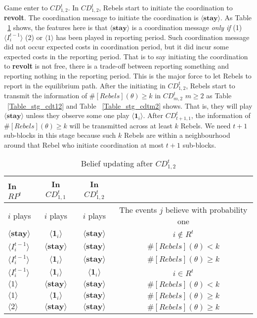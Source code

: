 \documentclass[12pt,letter]{article}
\theoremstyle{definition}
\theoremstyle{remark}
\theoremstyle{claim}
\begin{document}
Game enter to $CD^t_{1,2}$. In $CD^t_{1,2}$, Rebels start to initiate the coordination to \textbf{revolt}. The coordination message to initiate the coordination is $\langle \textbf{stay} \rangle$. As Table ~\ref{Table_blf_up_cdt12} shows, the features here is that $\langle \textbf{stay} \rangle$ is a coordination message \textit{only if} (1) $\langle  {I^{t-1}_i} \rangle$ (2) or $\langle 1 \rangle$ has been played in reporting period. Such coordination message did not occur expected costs in coordination period, but it did incur some expected costs in the reporting period. That is to say initiating the coordination to \textbf{revolt} is not free, there is a trade-off between reporting something and reporting nothing in the reporting period. This is the major force to let Rebels to report in the equilibrium path. After the initiating in $CD^t_{1,2}$, Rebels start to transmit the information of $\#[Rebels](\theta)\geq k$ in $CD^t_{m,2}$ $m\geq 2$ as Table ~\ref{Table_stg_cdt12} and Table ~\ref{Table_stg_cdtm2} shows. That is, they will play $\langle \textbf{stay} \rangle$ unless they observe some one play $\langle \mathbf{1}_i \rangle$. After $CD^t_{{t+1},1}$, the information of $\#[Rebels](\theta)\geq k$ will be transmitted across at least $k$ Rebels. We need $t+1$ sub-blocks in this stage because such $k$ Rebels are within a neighbourhood around that Rebel who initiate coordination at most $t+1$ sub-blocks.
\begin{table}[t]
\caption{Belief updating after $CD^t_{1,2}$}
\label{Table_blf_up_cdt12}
\begin{center}
\begin{tabular}{l c c c}
In $RP^t$ 	 	&  	In $CD^t_{1,1}$		&  In $CD^t_{1,2}$	  &\\
\hline
\hline
$i$ plays 		                             &  	$i$ plays		&				$i$ plays			& The events $j$ believe with probability one  \\
\hline
$\langle  \textbf{stay} \rangle$ 	& 	$\langle \mathbf{1}_i \rangle$	&  $\langle \textbf{stay} \rangle$ &  $i\notin R^t$ \\
$\langle  {I^{t-1}_i} \rangle$ 		&  $\langle \textbf{stay} \rangle$	&	$\langle \textbf{stay} \rangle$ &  $\#[Rebels](\theta)< k$   \\
$\langle  {I^{t-1}_i} \rangle$ 		&  $\langle \mathbf{1}_i \rangle$	&	$\langle \textbf{stay} \rangle$ &  $\#[Rebels](\theta)\geq k$    \\
$\langle  {I^{t-1}_i} \rangle$ 		&  $\langle \mathbf{1}_i \rangle$	&	$\langle \mathbf{1}_i \rangle$ &  $i\in R^t$  \\
$\langle 1 \rangle$ 		             &  $\langle \textbf{stay} \rangle$	&	$\langle \textbf{stay} \rangle$ &  $\#[Rebels](\theta)< k$\\
$\langle 1 \rangle$ 		             &  $\langle \mathbf{1}_i \rangle$	&	$\langle \textbf{stay} \rangle$ & $\#[Rebels](\theta)\geq k$\\
$\langle 2 \rangle$ 		             &  $\langle \textbf{stay} \rangle$	&	$\langle \textbf{stay} \rangle$ &  $\#[Rebels](\theta)\geq k$
\end{tabular}
\end{center}
\end{table}
\end{document}
